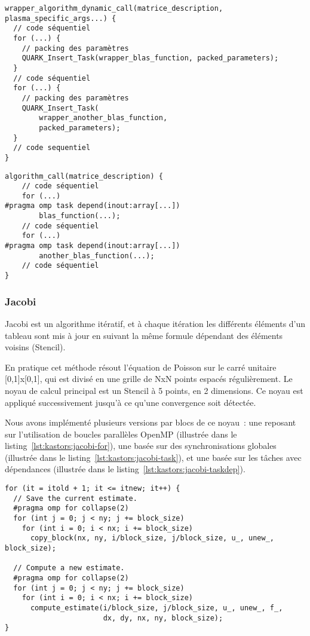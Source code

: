\begin{lstlisting}[caption=Format de l'algorithme dynamique,label=lst:kastors:dyn]
wrapper_algorithm_dynamic_call(matrice_description, plasma_specific_args...) {
  // code séquentiel
  for (...) {
    // packing des paramètres
    QUARK_Insert_Task(wrapper_blas_function, packed_parameters);
  }
  // code séquentiel
  for (...) {
    // packing des paramètres
    QUARK_Insert_Task(
        wrapper_another_blas_function,
        packed_parameters);
  }
  // code sequentiel
}
\end{lstlisting}
\begin{lstlisting}[caption=Format de l'algorithme OpenMP,label=lst:kastors:dyn-omp]
algorithm_call(matrice_description) {
    // code séquentiel
    for (...)
#pragma omp task depend(inout:array[...])
        blas_function(...);
    // code séquentiel
    for (...)
#pragma omp task depend(inout:array[...])
        another_blas_function(...);
    // code séquentiel
}
\end{lstlisting}


\subsubsection{Jacobi}

Jacobi est un algorithme itératif, et à chaque itération les différents éléments d'un tableau sont mis à jour en suivant la même formule dépendant des éléments voisins (Stencil).

En pratique cet méthode résout l'équation de Poisson sur le carré unitaire [0,1]x[0,1], qui est divisé en une grille de NxN points espacés régulièrement.
Le noyau de calcul principal est un Stencil à 5 points, en 2 dimensions.
Ce noyau est appliqué successivement jusqu'à ce qu'une convergence soit détectée.

Nous avons implémenté plusieurs versions par blocs de ce noyau~: une reposant sur l'utilisation de boucles parallèles OpenMP (illustrée dans le listing~\ref{lst:kastors:jacobi-for}), une basée sur des synchronisations globales (illustrée dans le listing~\ref{lst:kastors:jacobi-task}), et une basée sur les tâches avec dépendances (illustrée dans le listing~\ref{lst:kastors:jacobi-taskdep}).

\begin{lstlisting}[caption=Boucle itérative principale de Jacobi utilisant des for OpenMP,label=lst:kastors:jacobi-for]
for (it = itold + 1; it <= itnew; it++) {
  // Save the current estimate.
  #pragma omp for collapse(2)
  for (int j = 0; j < ny; j += block_size)
    for (int i = 0; i < nx; i += block_size)
      copy_block(nx, ny, i/block_size, j/block_size, u_, unew_, block_size);

  // Compute a new estimate.
  #pragma omp for collapse(2)
  for (int j = 0; j < ny; j += block_size)
    for (int i = 0; i < nx; i += block_size)
      compute_estimate(i/block_size, j/block_size, u_, unew_, f_,
                       dx, dy, nx, ny, block_size);
}
\end{lstlisting}


